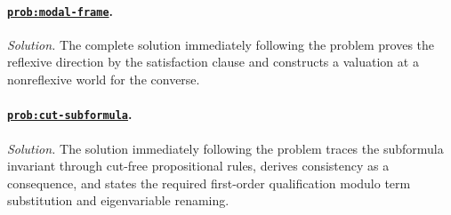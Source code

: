 \paragraph{\hyperref[prob:modal-frame]{\texttt{prob:modal-frame}}.}
\textit{Solution.}  The complete solution immediately following the problem
proves the reflexive direction by the satisfaction clause and constructs a
valuation at a nonreflexive world for the converse.

\paragraph{\hyperref[prob:cut-subformula]{\texttt{prob:cut-subformula}}.}
\textit{Solution.}  The solution immediately following the problem traces the
subformula invariant through cut-free propositional rules, derives consistency
as a consequence, and states the required first-order qualification modulo term
substitution and eigenvariable renaming.

